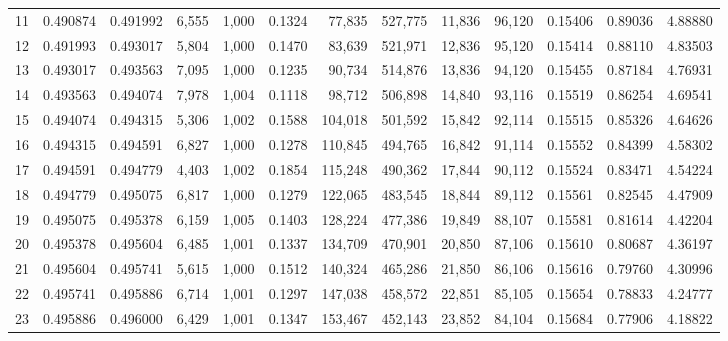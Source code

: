 \begin{tabular}{rrrrrrrrrrrrr}
11  &  0.490874 &  0.491992 &  6,555 &  1,000 &                                     0.1324 &   77,835 &  527,775 &   11,836 &   96,120 &  0.15406 &  0.89036 &  4.88880 \\
12  &  0.491993 &  0.493017 &  5,804 &  1,000 &                                     0.1470 &   83,639 &  521,971 &   12,836 &   95,120 &  0.15414 &  0.88110 &  4.83503 \\
13  &  0.493017 &  0.493563 &  7,095 &  1,000 &                                     0.1235 &   90,734 &  514,876 &   13,836 &   94,120 &  0.15455 &  0.87184 &  4.76931 \\
14  &  0.493563 &  0.494074 &  7,978 &  1,004 &                                     0.1118 &   98,712 &  506,898 &   14,840 &   93,116 &  0.15519 &  0.86254 &  4.69541 \\
15  &  0.494074 &  0.494315 &  5,306 &  1,002 &                                     0.1588 &  104,018 &  501,592 &   15,842 &   92,114 &  0.15515 &  0.85326 &  4.64626 \\
16  &  0.494315 &  0.494591 &  6,827 &  1,000 &                                     0.1278 &  110,845 &  494,765 &   16,842 &   91,114 &  0.15552 &  0.84399 &  4.58302 \\
17  &  0.494591 &  0.494779 &  4,403 &  1,002 &                                     0.1854 &  115,248 &  490,362 &   17,844 &   90,112 &  0.15524 &  0.83471 &  4.54224 \\
18  &  0.494779 &  0.495075 &  6,817 &  1,000 &                                     0.1279 &  122,065 &  483,545 &   18,844 &   89,112 &  0.15561 &  0.82545 &  4.47909 \\
19  &  0.495075 &  0.495378 &  6,159 &  1,005 &                                     0.1403 &  128,224 &  477,386 &   19,849 &   88,107 &  0.15581 &  0.81614 &  4.42204 \\
20  &  0.495378 &  0.495604 &  6,485 &  1,001 &                                     0.1337 &  134,709 &  470,901 &   20,850 &   87,106 &  0.15610 &  0.80687 &  4.36197 \\
21  &  0.495604 &  0.495741 &  5,615 &  1,000 &                                     0.1512 &  140,324 &  465,286 &   21,850 &   86,106 &  0.15616 &  0.79760 &  4.30996 \\
22  &  0.495741 &  0.495886 &  6,714 &  1,001 &                                     0.1297 &  147,038 &  458,572 &   22,851 &   85,105 &  0.15654 &  0.78833 &  4.24777 \\
23  &  0.495886 &  0.496000 &  6,429 &  1,001 &                                     0.1347 &  153,467 &  452,143 &   23,852 &   84,104 &  0.15684 &  0.77906 &  4.18822 \\

\end{tabular}
